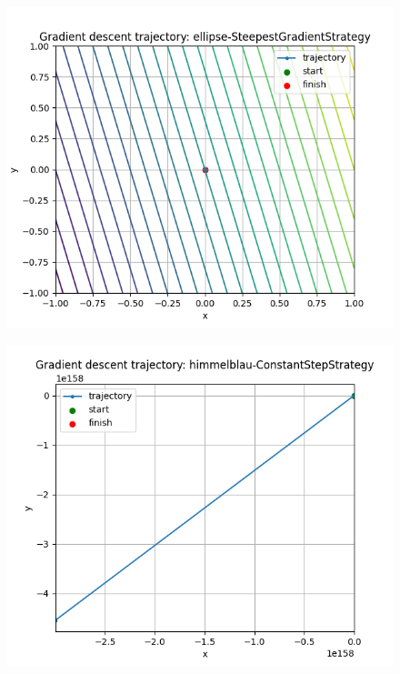 \documentclass{article}
\begin{document}
\begin{figure}[H]
    \centering
    \includegraphics[width=1\linewidth]{ellipse-SteepestGradientStrategy.png}
    \label{fig:enter-label}
\end{figure}
\begin{figure}[H]
    \centering
    \includegraphics[width=1\linewidth]{himmelblau-ConstantStepStrategy.png}
    \label{fig:enter-label}
\end{figure}
\end{document}

